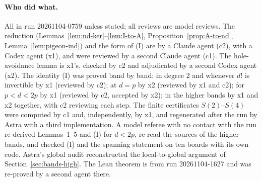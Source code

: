 \paragraph{Who did what.}  All in run 20261104-0759 unless stated; all reviews are model
reviews.  The reduction (Lemmas~\ref{lem:nd-ker}--\ref{lem:I-to-A},
Proposition~\ref{prop:A-to-nd}, Lemma~\ref{lem:pigeon-ind}) and the form of (I) are by a Claude
agent (c2), with a Codex agent (x1), and were reviewed by a second Claude agent (c1).  The
hole-avoidance lemma is x1's, checked by c2 and adjudicated by a second Codex agent (x2).  The
identity (I) was proved band by band: in degree $2$ and whenever $d!$ is invertible by x1
(reviewed by c2); at $d=p$ by x2 (reviewed by x1 and c2); for $p<d<2p$ by x1 (reviewed by c2,
accepted by x2); in the higher bands by x1 and x2 together, with c2 reviewing each step.  The
finite certificates $S(2)$--$S(4)$ were computed by c1 and, independently, by x1, and
regenerated after the run by Astra with a third implementation.  A model referee with no
contact with the run re-derived Lemmas~1--5 and (I) for $d<2p$, re-read the sources of the
higher bands, and checked (I) and the spanning statement on ten boards with its own code.
Astra's global audit reconstructed the local-to-global argument of
Section~\ref{sec:bands-high}.  The Lean theorem is from run 20261104-1627 and was re-proved by a
second agent there.
